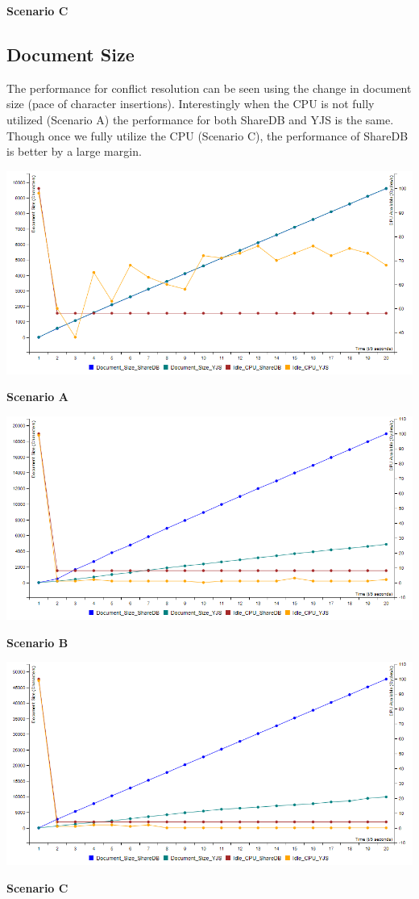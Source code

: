 \documentclass[9pt, titlepage]{article}
\begin{document}
\begin{center}
    \textbf{Scenario C}

  \end{center}

  \subsection{Document Size}
  The performance for conflict resolution can be seen using the change in document size (pace of character insertions).
  Interestingly when the CPU is not fully utilized (Scenario A) the performance for both ShareDB and YJS is the same.
  Though once we fully utilize the CPU (Scenario C), the performance of ShareDB is better by a large margin.
  \begin{center}
    \includegraphics[scale=0.48]{scenario_a/document.png}

    \textbf{Scenario A}
    
    \includegraphics[scale=0.48]{scenario_b/document.png}
    
    \textbf{Scenario B}
    
    \includegraphics[scale=0.48]{scenario_c/document.png}
    
    \textbf{Scenario C}
  \end{center}
\end{document}
